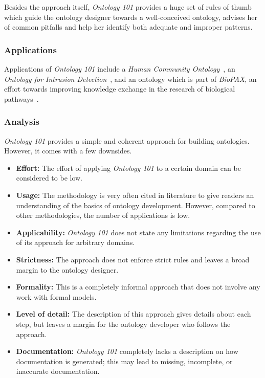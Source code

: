 Besides the approach itself, \emph{Ontology 101} provides a huge set of rules of thumb which guide the ontology designer towards a well-conceived ontology, advises her of common pitfalls and help her identify both adequate and improper patterns.

\subsubsection{Applications}

Applications of \emph{Ontology 101} include a \emph{Human Community Ontology}~\cite{HumanCommunityOntology}, an \emph{Ontology for Intrusion Detection}~\cite{IDSOntology}, and an ontology which is part of \emph{BioPAX}, an effort towards improving knowledge exchange in the research of biological pathways~\cite{BioPAX}.

\subsubsection{Analysis}

\emph{Ontology 101} provides a simple and coherent approach for building ontologies. However, it comes with a few downsides.

\begin{itemize}
  \item \textbf{Effort:} The effort of applying \emph{Ontology 101} to a certain domain can be considered to be low.
  
   \item \textbf{Usage:} The methodology is very often cited in literature to give readers an understanding of the basics of ontology development. However, compared to other methodologies, the number of applications is low.
  
  \item \textbf{Applicability:} \emph{Ontology 101} does not state any limitations regarding the use of its approach for arbitrary domains.
  
  \item \textbf{Strictness:} The approach does not enforce strict rules and leaves a broad margin to the ontology designer.
  
  \item \textbf{Formality:} This is a completely informal approach that does not involve any work with formal models.
  
  \item \textbf{Level of detail:} The description of this approach gives details about each step, but leaves a margin for the ontology developer who follows the approach.
  
  \item \textbf{Documentation:} \emph{Ontology 101} completely lacks a description on how documentation is generated; this may lead to missing, incomplete, or inaccurate documentation.
\end{itemize}

